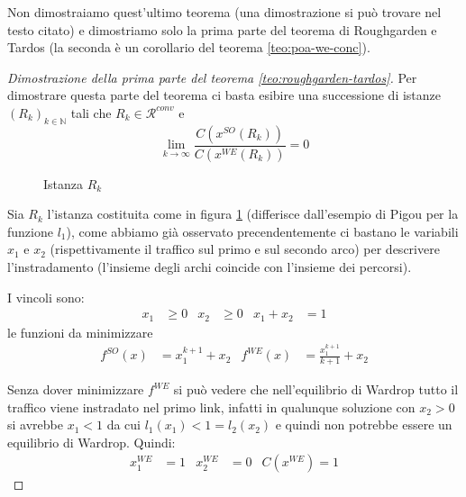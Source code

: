 \documentclass[a4paper]{article}
\theoremstyle{plain}
\theoremstyle{definition}
\theoremstyle{remark}
\newcommand{\pa}[1]{\left(#1\right)}
\begin{document}
Non dimostraiamo quest'ultimo teorema (una dimostrazione si può
trovare nel testo citato) e dimostriamo solo la prima
parte del teorema di Roughgarden e Tardos (la seconda è un corollario
del teorema \ref{teo:poa-we-conc}).

\begin{proof}[Dimostrazione della prima parte del teorema \ref{teo:roughgarden-tardos}]
  Per dimostrare questa parte del teorema ci basta esibire una
  successione di istanze $\pa{R_k}_{k\in \mathbb{N}}$ tali che $R_k\in
  \mathcal{R}^{conv}$ e
  \[ \lim _{k\to \infty} \frac{C\pa{ x^{SO}\pa{R_k}}}{C\pa{
x^{WE}\pa{R_k}}} = 0 \]

  \begin{figure}[ht]
    \centering
    \caption{Istanza $R_k$}
    \label{fig:esempio-conv-poa}
  \end{figure}

  Sia $R_k$ l'istanza costituita come in figura
  \ref{fig:esempio-conv-poa} (differisce dall'esempio di Pigou per la
  funzione $l_1$), come abbiamo già osservato precendentemente ci
  bastano le variabili $x_1$ e $x_2$ (rispettivamente il traffico sul
  primo e sul secondo arco) per descrivere l'instradamento (l'insieme
  degli archi coincide con l'insieme dei percorsi).
  
  I vincoli sono:
  \begin{align*}
    x_1 &\ge 0 & x_2 &\ge 0 & x_1 + x_2 &= 1
  \end{align*}
  le funzioni da minimizzare
  \begin{align*}
    f^{SO}(x) &= x_1^{k+1} + x_2 & f^{WE}(x) &= \frac{x_1^{k+1}}{k+1}
                                              + x_2
  \end{align*}
  
  Senza dover minimizzare $f^{WE}$ si può vedere che nell'equilibrio
  di Wardrop tutto il traffico viene instradato nel primo link,
  infatti in qualunque soluzione con $x_2>0$ si avrebbe $x_1<1$ da cui
  $l_1(x_1) < 1 = l_2(x_2)$ e quindi non potrebbe essere un equilibrio
  di Wardrop. Quindi:
  \begin{align*}
    x^{WE}_1 &= 1 & x^{WE}_2 &= 0 & C\pa{x^{WE}} = 1
  \end{align*}


\end{proof}
\end{document}

